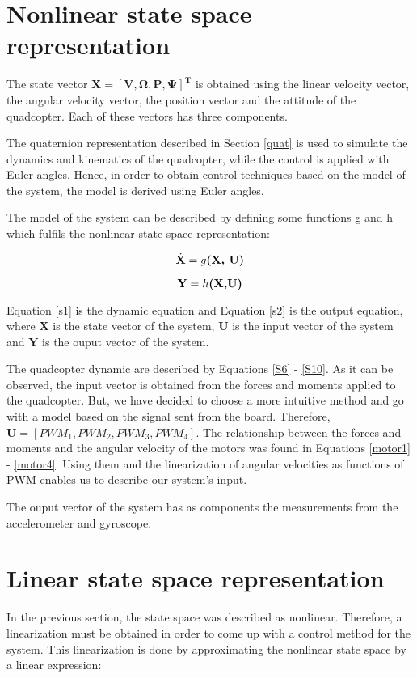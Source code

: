 \section{Nonlinear state space representation}
The state vector $\mathbf{X=[V, \Omega, P, \Psi]^{T}}$ is obtained using the linear velocity vector, the angular velocity vector, the position vector and the attitude of the quadcopter. Each of these vectors has three components.

The quaternion representation described in Section \ref{quat} is used to simulate the dynamics and kinematics of the quadcopter, while the control is applied with Euler angles. Hence, in order to obtain control techniques based on the model of the system, the model is derived using Euler angles.

The model of the system can be described by defining some functions g and h which fulfils the nonlinear state space representation:

\begin{equation}
\label{s1} 
 	\dot{\textbf{X}}=g\textbf{(X, U)} \\
 \end{equation}

\begin{equation}
\label{s2} 
 	\textbf{Y}=h\textbf{(X,U)} \\
 \end{equation}
 
Equation \ref{s1} is the dynamic equation and Equation \ref{s2}  is the output equation, where \textbf{X} is the state vector of the system, \textbf{U} is the input vector of the system and \textbf{Y} is the ouput vector of the system.

The quadcopter dynamic are described by Equations \ref{S6} - \ref{S10}. As it can be observed, the input vector is obtained from the forces and moments applied to the quadcopter. But, we have decided to choose a more intuitive method and go with a model based on the signal sent from the board. Therefore, $\mathbf{U}=[PWM_{1}, PWM_{2}, PWM_{3}, PWM_{4}]$. The relationship between the forces and moments and the angular velocity of the motors was found in Equations \ref{motor1} - \ref{motor4}. Using them and the linearization of angular velocities as functions of PWM enables us to describe our system's input.

The ouput vector of the system has as components the measurements from the accelerometer and gyroscope.

\section{Linear state space representation}\label{ssr}
In the previous section, the state space was described as nonlinear. Therefore, a linearization must be obtained in order to come up with a control method for the system. This linearization is done by approximating the nonlinear state space by a linear expression:

